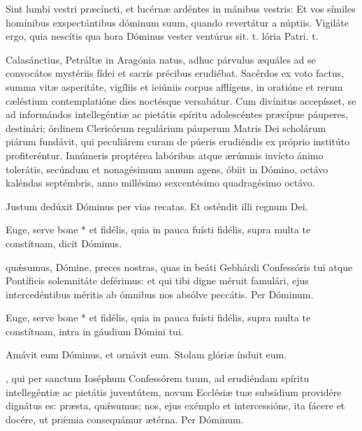 \documentclass[fontsize=9pt,paper=A6,twoside,BCOR=1mm,DIV=22,headinclude]{scrarticle}
\renewcommand\A{\Ant}
\begin{document}
\begin{multicols}{2}
\R Sint lumbi vestri præcíncti, et lucérnæ ardéntes in mánibus vestris: \red{*} Et vos símiles homínibus exspectántibus dóminum suum, quando revertátur a núptiis.
\V Vigiláte ergo, quia nescítis qua hora Dóminus vester ventúrus sit. t. lória Patri. t.

 Calasánctius, Petráltæ in Aragónia natus, adhuc párvulus æquáles ad se convocátos mystériis fídei et sacris précibus erudiébat. Sacérdos ex voto factus, summa vitæ asperitáte, vigíliis et ieiúniis corpus afflígens, in oratióne et rerum cæléstium contemplatióne dies noctésque versabátur. Cum divínitus accepísset, se ad informándos intellegéntiæ ac pietátis spíritu adolescéntes præcípue páuperes, destinári; órdinem Clericórum regulárium páuperum Matris Dei scholárum piárum fundávit, qui peculiárem curam de púeris erudiéndis ex próprio institúto profiteréntur. Innúmeris proptérea labóribus atque ærúmnis invícto ánimo tolerátis, secúndum et nonagésimum annum agens, óbiit in Dómino, octávo kaléndas septémbris, anno millésimo sexcentésimo quadragésimo octávo.

\Te 


\V Justum dedúxit Dóminus per vias recatas.
\R Et osténdit illi regnum Dei.

\B Euge, serve bone * et fidélis, quia in pauca fuísti fidélis, supra multa te constítuam, dicit Dóminus.

 qu\'æsumus, Dómine, preces nostras, quas in beáti Gebhárdi Confessóris tui atque Pontíficis solemnitáte deférimus: et qui tibi digne méruit famulári, ejus intercedéntibus méritis ab ómnibus nos absólve peccátis. Per Dóminum.


\A Euge, serve bone * et fidélis, quia in pauca fuísti fidélis, supra multa te constítuam, intra in gáudium Dómini tui.

\V Amávit eum Dóminus, et ornávit eum.
\R Stolam glóriæ índuit eum.

, qui per sanctum Ioséphum Confessórem tuum, ad erudiéndam spíritu intellegéntiæ ac pietátis juventútem, novum Ecclésiæ tuæ subsídium providére dignátus es: præsta, quǽsumus; nos, ejus exémplo et intercessióne, ita fácere et docére, ut prǽmia consequámur ætérna. Per Dóminum.



\end{multicols}
\end{document}

